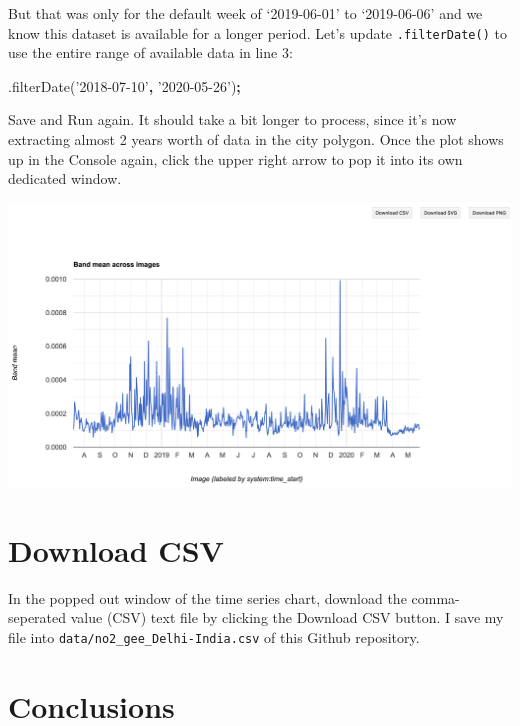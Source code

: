 \documentclass[]{book}
\newenvironment{Shaded}{\begin{snugshade}}{\end{snugshade}}
\newcommand{\AttributeTok}[1]{\textcolor[rgb]{0.77,0.63,0.00}{#1}}
\newcommand{\NormalTok}[1]{#1}
\newcommand{\OperatorTok}[1]{\textcolor[rgb]{0.81,0.36,0.00}{\textbf{#1}}}
\newcommand{\StringTok}[1]{\textcolor[rgb]{0.31,0.60,0.02}{#1}}
\begin{document}
But that was only for the default week of `2019-06-01' to `2019-06-06' and we know this dataset is available for a longer period. Let's update \texttt{.filterDate()} to use the entire range of available data in line 3:

\begin{Shaded}
\begin{Highlighting}[]
\NormalTok{  .}\AttributeTok{filterDate}\NormalTok{(}\StringTok{'2018-07-10'}\OperatorTok{,} \StringTok{'2020-05-26'}\NormalTok{)}\OperatorTok{;}
\end{Highlighting}
\end{Shaded}

Save and Run again. It should take a bit longer to process, since it's now extracting almost 2 years worth of data in the city polygon. Once the plot shows up in the Console again, click the upper right arrow to pop it into its own dedicated window.

\includegraphics{images/gee_ts-chart_all-popout.png}

\hypertarget{download-csv}{%
\section{Download CSV}\label{download-csv}}

In the popped out window of the time series chart, download the comma-seperated value (CSV) text file by clicking the {Download CSV} button. I save my file into \texttt{data/no2\_gee\_Delhi-India.csv} of this Github repository.

\hypertarget{conclusions}{%
\section*{Conclusions}\label{conclusions}}
\end{document}
